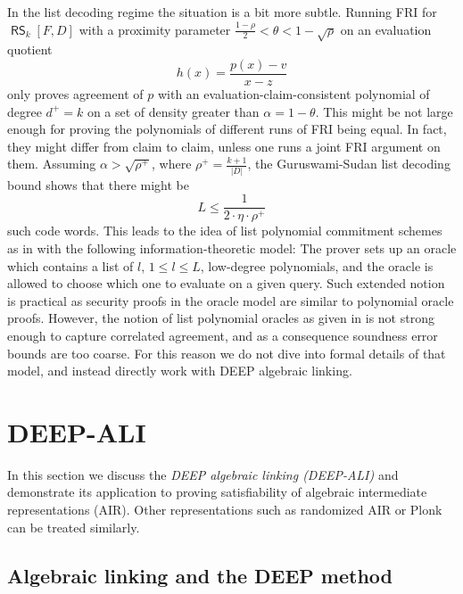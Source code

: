 \documentclass[11pt]{article}
\theoremstyle{definition}
\theoremstyle{remark}
\DeclareMathOperator{\RS}{\mathsf{RS}}
\begin{document}
In the list decoding regime the situation is a bit more subtle. 
Running FRI for $\RS_k[F,D]$ with a proximity parameter $\frac{1-\rho}{2}<\theta<1-\sqrt\rho$  on an evaluation quotient
\[
h(x)=\frac{p(x)-v}{x-z}
\]
only proves agreement of $p$ with an evaluation-claim-consistent polynomial of degree $d^+ = k$ on a set of density greater than $\alpha = 1-\theta$. 
This might be not large enough for proving the polynomials of different runs of FRI being equal. 
In fact, they might differ from claim to claim, unless one runs a joint FRI argument on them. 
Assuming $\alpha >\sqrt{\rho^+}$, where $\rho^+ = \frac{k+1}{|D|}$, the Guruswami-Sudan list decoding bound shows that there might be 
\[
L\leq \frac{1}{2\cdot \eta\cdot \rho^+}
\]
such code words. 
This leads to the idea of list polynomial commitment schemes as in \cite{Redshift} with the following information-theoretic model: 
The prover sets up an oracle which contains a list of $l$, $1\leq l\leq L$, low-degree polynomials, and the oracle is allowed to choose which one to evaluate on a given query. 
Such extended notion is practical as security proofs in the oracle model are similar to polynomial oracle proofs.  
However, the notion of list polynomial oracles as given in \cite{Redshift} is not strong enough to capture correlated agreement, and as a consequence soundness error bounds are too coarse. 
For this reason we do not dive into formal details of that model, and instead directly work with DEEP algebraic linking.


\section{DEEP-ALI}

In this section we discuss the \textit{DEEP algebraic linking (DEEP-ALI)} \cite{DEEPFRI} and demonstrate its application to proving satisfiability of algebraic intermediate representations (AIR). 
Other representations such as randomized AIR or Plonk \cite{Plonk} can be treated similarly. 

\subsection{Algebraic linking and the DEEP method}
 
\end{document}
